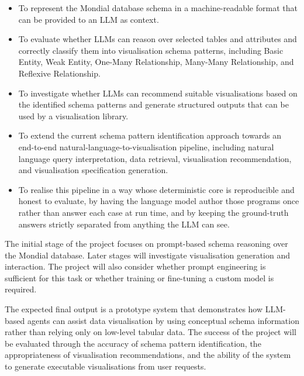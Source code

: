 \begin{itemize}
    \item To represent the Mondial database schema in a machine-readable format that can be provided to an LLM as context.

    \item To evaluate whether LLMs can reason over selected tables and attributes and correctly classify them into visualisation schema patterns, including Basic Entity, Weak Entity, One-Many Relationship, Many-Many Relationship, and Reflexive Relationship.

    \item To investigate whether LLMs can recommend suitable visualisations based on the identified schema patterns and generate structured outputs that can be used by a visualisation library.

    \item To extend the current schema pattern identification approach towards an end-to-end natural-language-to-visualisation pipeline, including natural language query interpretation, data retrieval, visualisation recommendation, and visualisation specification generation.

    \item To realise this pipeline in a way whose deterministic core is reproducible and honest to evaluate, by having the language model author those programs once rather than answer each case at run time, and by keeping the ground-truth answers strictly separated from anything the LLM can see.
\end{itemize}

The initial stage of the project focuses on prompt-based schema reasoning over the Mondial database. Later stages will investigate visualisation generation and interaction. The project will also consider whether prompt engineering is sufficient for this task or whether training or fine-tuning a custom model is required.

The expected final output is a prototype system that demonstrates how LLM-based agents can assist data visualisation by using conceptual schema information rather than relying only on low-level tabular data. The success of the project will be evaluated through the accuracy of schema pattern identification, the appropriateness of visualisation recommendations, and the ability of the system to generate executable visualisations from user requests.

